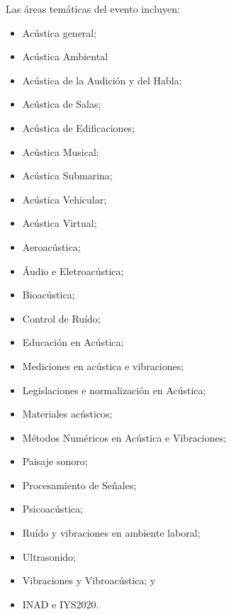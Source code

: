 \documentclass[12pt, a4paper, twoside, twocolumn]{article}
\begin{document}
\vspace{5pt}

Las áreas temáticas del evento incluyen:
%	
\begin{itemize}[noitemsep,topsep=-1ex] \itemsep=1.5pt
\item[\textbullet]Acústica general; 
\item[\textbullet]Acústica Ambiental
\item[\textbullet]Acústica de la Audición y del Habla;
\item[\textbullet]Acústica de Salas;
\item[\textbullet]Acústica de Edificaciones;
\item[\textbullet]Acústica Musical;
\item[\textbullet]Acústica Submarina;
\item[\textbullet]Acústica Vehicular;
\item[\textbullet]Acústica Virtual;
\item[\textbullet]Aeroacústica;
\item[\textbullet]Áudio e Eletroacústica;
\item[\textbullet]Bioacústica;
\item[\textbullet]Control de Ruído;
\item[\textbullet]Educación en Acústica;
\item[\textbullet]Mediciones en acústica e vibraciones;
\item[\textbullet]Legislaciones e normalización en Acústica;
\item[\textbullet]Materiales acústicos;
\item[\textbullet]Métodos Numéricos en Acústica e Vibraciones;
\item[\textbullet]Paisaje sonoro;
\item[\textbullet]Procesamiento de Señales;
\item[\textbullet]Psicoacústica;
\item[\textbullet]Ruído y vibraciones en ambiente laboral;
\item[\textbullet]Ultrasonido; 
\item[\textbullet]Vibraciones y Vibroacústica; y
\item[\textbullet]INAD e IYS2020.
	\end{itemize}
	

\end{document}

